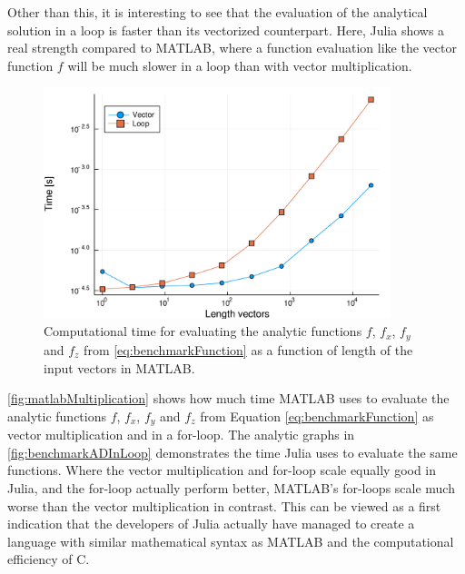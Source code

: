 Other than this, it is interesting to see that the evaluation of the analytical solution in a loop is faster than its vectorized counterpart. Here, Julia shows a real strength compared to MATLAB, where a function evaluation like the vector function $f$ will be much slower in a loop than with vector multiplication.
\begin{figure}[H]
    \centering
    \includegraphics[width = 0.9\textwidth]{figures/benchmark_matlab_multiplication.pdf}
    \caption{Computational time for evaluating the analytic functions $f$, $f_x$, $f_y$ and $f_z$ from \eqref{eq:benchmarkFunction} as a function of length of the input vectors in MATLAB.}
    \label{fig:matlabMultiplication}
\end{figure}
\autoref{fig:matlabMultiplication} shows how much time MATLAB uses to evaluate the analytic functions $f$, $f_x$, $f_y$ and $f_z$ from Equation \eqref{eq:benchmarkFunction} as vector multiplication and in a for-loop. The analytic graphs in \autoref{fig:benchmarkADInLoop} demonstrates the time Julia uses to evaluate the same functions. Where the vector multiplication and for-loop scale equally good in Julia, and the for-loop actually perform better, MATLAB's for-loops scale much worse than the vector multiplication in contrast. This can be viewed as a first indication that the developers of Julia actually have managed to create a language with similar mathematical syntax as MATLAB and the computational efficiency of C.